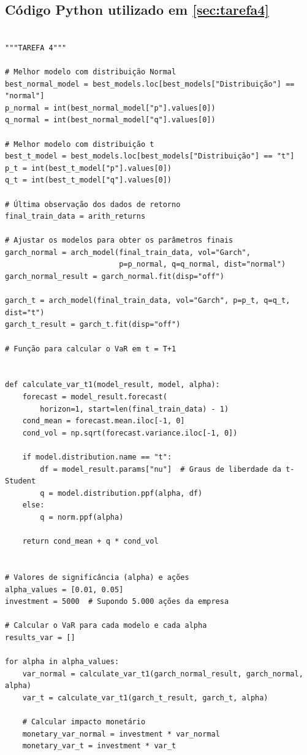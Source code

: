 \documentclass[a4paper, 12pt]{article}
\begin{document}
\subsection{Código Python utilizado em \ref{sec:tarefa4}}\label{apendice:tarefa4}
\begin{lstlisting}[style=python]
    
"""TAREFA 4"""

# Melhor modelo com distribuição Normal
best_normal_model = best_models.loc[best_models["Distribuição"] == "normal"]
p_normal = int(best_normal_model["p"].values[0])
q_normal = int(best_normal_model["q"].values[0])

# Melhor modelo com distribuição t
best_t_model = best_models.loc[best_models["Distribuição"] == "t"]
p_t = int(best_t_model["p"].values[0])
q_t = int(best_t_model["q"].values[0])

# Última observação dos dados de retorno
final_train_data = arith_returns

# Ajustar os modelos para obter os parâmetros finais
garch_normal = arch_model(final_train_data, vol="Garch",
                          p=p_normal, q=q_normal, dist="normal")
garch_normal_result = garch_normal.fit(disp="off")

garch_t = arch_model(final_train_data, vol="Garch", p=p_t, q=q_t, dist="t")
garch_t_result = garch_t.fit(disp="off")

# Função para calcular o VaR em t = T+1


def calculate_var_t1(model_result, model, alpha):
    forecast = model_result.forecast(
        horizon=1, start=len(final_train_data) - 1)
    cond_mean = forecast.mean.iloc[-1, 0]
    cond_vol = np.sqrt(forecast.variance.iloc[-1, 0])

    if model.distribution.name == "t":
        df = model_result.params["nu"]  # Graus de liberdade da t-Student
        q = model.distribution.ppf(alpha, df)
    else:
        q = norm.ppf(alpha)

    return cond_mean + q * cond_vol


# Valores de significância (alpha) e ações
alpha_values = [0.01, 0.05]
investment = 5000  # Supondo 5.000 ações da empresa

# Calcular o VaR para cada modelo e cada alpha
results_var = []

for alpha in alpha_values:
    var_normal = calculate_var_t1(garch_normal_result, garch_normal, alpha)
    var_t = calculate_var_t1(garch_t_result, garch_t, alpha)

    # Calcular impacto monetário
    monetary_var_normal = investment * var_normal
    monetary_var_t = investment * var_t


\end{lstlisting}
\end{document}

